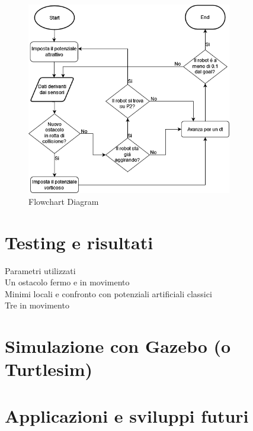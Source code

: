\documentclass[14pt,twoside,a4paper]{extarticle}
\begin{document}
\begin{figure}[H]
\caption{Flowchart Diagram} \label{flow}
\centering
\includegraphics[width=0.8\textwidth]{flowchartDiagram.png}
\end{figure}

\section{Testing e risultati}
Parametri utilizzati\\
Un ostacolo fermo e in movimento\\
Minimi locali e confronto con potenziali artificiali classici\\
Tre in movimento\\

\section{Simulazione con Gazebo (o Turtlesim)}

\section{Applicazioni e sviluppi futuri}

\newpage
\listoffigures
\printbibliography
\end{document}
